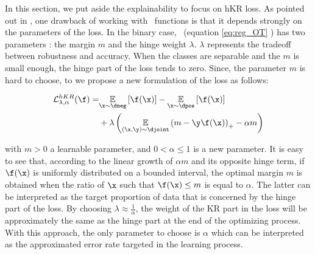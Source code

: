 
In this section, we put aside the explainability to focus on hKR loss.
As pointed out in \cite{bethunelip}, one drawback of working with \onlyonelip~functions is that it depends strongly on the parameters of the loss. In the binary case, \losshkr ~(equation \ref{eq:reg_OT} ) has two parameters : the margin $m$ and the hinge weight $\lambda$. $\lambda$ represents the tradeoff between robustness and accuracy. When the classes are separable and the $m$ is small enough, the hinge part of the loss tends to zero. Since, the parameter $m$ is hard to choose, to we propose a new formulation of the loss as follows:


\begin{align}\label{eq:reghrk}
\begin{split}
 \mathcal{L}^{hKR}_{\lambda,\alpha}(\f) =&	\underset{\x \sim \dneg}{\mathbb{E}} \left[\f(\x)\right]-\underset{\x \sim \dpos}{\mathbb{E}}\left[\f(\x)\right]\\
 & +\lambda\left(\underset{(\x, \y) \sim \djoint}{\mathbb{E}} \left(m-\y \f(\x)\right)_+ -\alpha m\right)
	\end{split}
\end{align}

with $m>0$ a learnable parameter,
and $0<\alpha \leq 1$ is a new parameter. It is easy to see that, according to the linear growth of $\alpha m$ and its opposite hinge term, if $\f(\x)$ is uniformly distributed on a bounded interval, the optimal margin $m$ is obtained when the ratio of $\x$ such that $\f(\x)\leq m$ is equal to $\alpha$. The latter  can be interpreted as the target proportion of data that is concerned by the hinge part of the loss. By choosing $\lambda \approx \frac{1}{\alpha}$, the weight of the KR part in the loss will be approximately the same as the hinge part at the end of the optimizing process. With this approach, the only parameter to choose is $\alpha$ which can be interpreted as the approximated error rate targeted in the learning process. 


